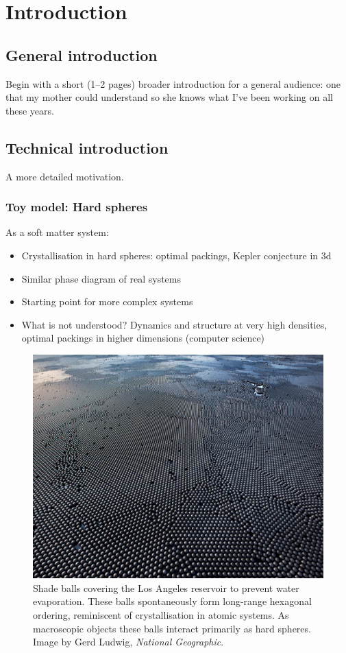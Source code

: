 \documentclass[12pt]{report}
\begin{document}
\chapter{Introduction}

\section{General introduction}
Begin with a short (1–2 pages) broader introduction for a general audience: one that my mother could understand so she knows what I’ve been working on all these years.

\section{Technical introduction}
A more detailed motivation.

\subsection{Toy model: Hard spheres}

As a soft matter system:
\begin{itemize}
\item Crystallisation in hard spheres: optimal packings, Kepler conjecture in 3d
\item Similar phase diagram of real systems
\item Starting point for more complex systems
\item What is not understood? Dynamics and structure at very high densities, optimal packings in higher dimensions (computer science)
\end{itemize}

\begin{figure}
  \includegraphics[width=\linewidth]{shade-balls}
  \caption{
    Shade balls covering the Los Angeles reservoir to prevent water evaporation.
    These balls spontaneously form long-range hexagonal ordering, reminiscent of crystallisation in atomic systems.
    As macroscopic objects these balls interact primarily as hard spheres.
    Image by Gerd Ludwig, \emph{National Geographic}.}
  \label{fig:shade-balls}
\end{figure}
\end{document}

